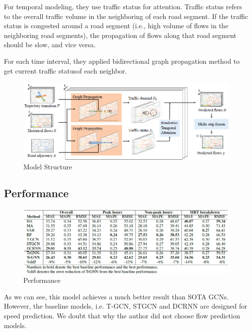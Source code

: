 \documentclass[fontset=none]{ctexart}
\theoremstyle{definition}
\theoremstyle{remark}
\begin{document}
For temporal modeling, they use traffic status for attention.
Traffic status refers to the
overall traffic volume in the neighboring of each road segment.
If the traffic status is congested around a road segment
(i.e., high volume of flows in the neighboring road
segments), the propagation of flows along that road segment
should be slow, and vice versa.

For each time interval, they applied bidirectional graph propagation method 
to get current traffic statusof each neighbor.

\clearpage
\begin{figure}[htb]
  \centering
  \includegraphics[width=\textwidth]{images/9-1-2.png}
  \caption{Model Structure}
  \label{912}
\end{figure}

\subsection{Performance}
\begin{figure}[htb]
  \centering
  \includegraphics[width=\textwidth]{images/9-1-3.png}
  \caption{Performance}
  \label{913}
\end{figure}
As we can see, this model achieves a much better result than SOTA GCNs.
However, the baseline models, i.e. T-GCN, STGCN and DCRNN are designed for speed prediction.
We doubt that why the author did not choose flow prediction models.
\end{document}
